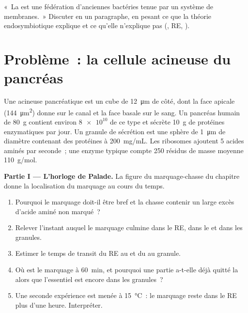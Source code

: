 \begin{exercise}[$\star\star\star$]\label{exo:b1:eukaryotic-cell:12}
«~La  est une fédération d'anciennes bactéries tenue
par un système de membranes.~» Discuter en un paragraphe, en pesant ce
que la théorie endosymbiotique explique et ce qu'elle n'explique pas
(, RE, ).
\end{exercise}

\section{Problème~: la cellule acineuse du pancréas}

\begin{problem}
\label{pb:b1:eukaryotic-cell:1}
Une  acineuse pancréatique est un cube de \qty{12}{\micro m} de
côté, dont la face apicale (\qty{144}{\micro m^2}) donne sur le canal et
la face basale sur le sang. Un pancréas humain de \qty{80}{g} contient
environ $\num{8e10}$  de ce type et sécrète \qty{10}{g} de
protéines enzymatiques par jour. Un granule de sécrétion est une sphère
de \qty{1}{\micro m} de diamètre contenant des protéines à
\qty{200}{mg/mL}. Les ribosomes ajoutent \qty{5}{} acides aminés par
seconde~; une enzyme typique compte \qty{250}{} résidus de masse moyenne
\qty{110}{g/mol}.

\medskip
\noindent\textbf{Partie I --- L'horloge de Palade.}
La figure du marquage-chasse du chapitre donne la localisation du
marquage au cours du temps.
\begin{enumerate}
  \item Pourquoi le marquage doit-il être bref et la chasse contenir un
        large excès d'acide aminé non marqué~?
  \item Relever l'instant auquel le marquage culmine dans le RE, dans le
         et dans les granules.
  \item Estimer le temps de transit du RE au  et du  au
        granule.
  \item Où est le marquage à \qty{60}{min}, et pourquoi une partie
        a-t-elle déjà quitté la  alors que l'essentiel est encore
        dans les granules~?
  \item Une seconde expérience est menée à \qty{15}{\celsius}~: le
        marquage reste dans le RE plus d'une heure. Interpréter.
\end{enumerate}


\end{problem}

